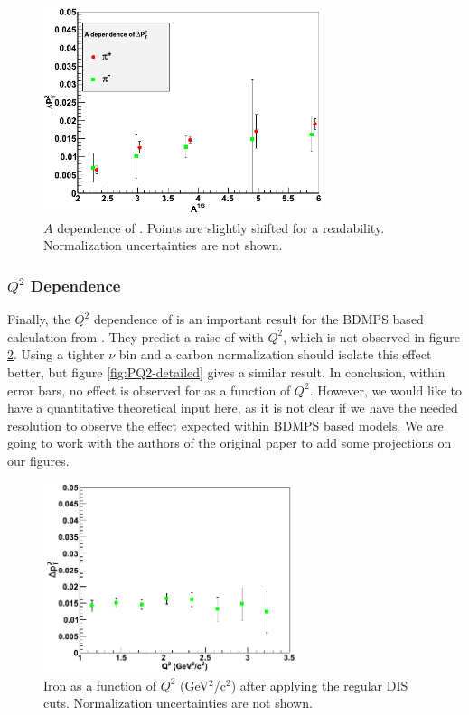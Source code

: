 \begin{figure}[tbp]
\centering
\includegraphics[width=8.2cm] {chap6-fig/F_PvA.png} 
\caption {$A$ dependence of \dptp. Points are slightly shifted for a readability. Normalization uncertainties are not shown.}
\label{fig:PA}
\end{figure}

\subsubsection{$Q^2$ Dependence}

Finally, the $Q^2$ dependence of \dpt is an important result for the BDMPS based 
calculation from \cite{Domdey:2008aq}. They predict a raise of \dpt with $Q^2$, 
which is not observed in figure \ref{fig:PQ2}. Using a tighter $\nu$ bin and a 
carbon normalization should isolate this effect better, but figure \ref{fig:PQ2-detailed}
gives a similar result. In conclusion, within error bars, no effect is observed for 
\dpt as a function of $Q^2$. However, we would like to have a quantitative theoretical 
input here, as it is not clear if we have the needed resolution to observe the effect 
expected within BDMPS based models. We are going to work with the authors of the original 
paper to add some projections on our figures.

\begin{figure}[tbp]
\centering
\includegraphics[width=7.4cm] {chap6-fig/F_PvQ2.png} 
\caption {Iron \dpt as a function of $Q^2$ (GeV$^2$/c$^2$) after applying the regular DIS cuts. Normalization uncertainties are not shown.}
\label{fig:PQ2}
\end{figure}

